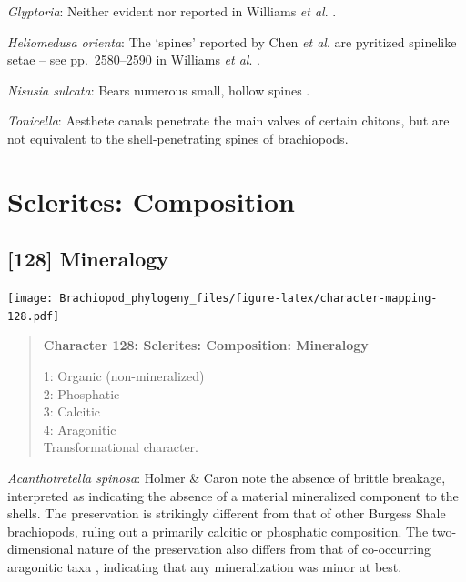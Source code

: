 \documentclass[openany]{book}
\begin{document}
\hypertarget{Glyptoria-coding-127}{}
\emph{Glyptoria}: Neither evident nor reported in Williams \emph{et al}.
\citeyearpar{Williams2000LinguliformeaCraniiformea}.

\hypertarget{Heliomedusa_orienta-coding-127}{}
\emph{Heliomedusa orienta}: The `spines' reported by Chen \emph{et al}.
\citeyearpar{Chen2007Reinterpretationof} are pyritized spinelike setae
-- see pp.~2580--2590 in Williams \emph{et al}.
\citeyearpar{Williams2007Supplement}.

\hypertarget{Nisusia_sulcata-coding-127}{}
\emph{Nisusia sulcata}: Bears numerous small, hollow spines
\citep{Williams2000LinguliformeaCraniiformea}.

\hypertarget{Tonicella-coding-127}{}
\emph{Tonicella}: Aesthete canals penetrate the main valves of certain
chitons, but are not equivalent to the shell-penetrating spines of
brachiopods.

\section{Sclerites: Composition}\label{sclerites-composition}

\subsection*{{[}128{]} Mineralogy}\label{mineralogy}

\texttt{[image: Brachiopod\_phylogeny\_files/figure-latex/character-mapping-128.pdf]}

\begin{quote}
\textbf{Character 128: Sclerites: Composition: Mineralogy}

1: Organic (non-mineralized)\\
2: Phosphatic\\
3: Calcitic\\
4: Aragonitic\\
Transformational character.
\end{quote}

\hypertarget{Acanthotretella_spinosa-coding-128}{}
\emph{Acanthotretella spinosa}: Holmer \& Caron
\citeyearpar{Holmer2006Aspinose} note the absence of brittle breakage,
interpreted as indicating the absence of a material mineralized
component to the shells. The preservation is strikingly different from
that of other Burgess Shale brachiopods, ruling out a primarily calcitic
or phosphatic composition. The two-dimensional nature of the
preservation also differs from that of co-occurring aragonitic taxa
\citep[hyoliths;][ p.~273]{Holmer2006Aspinose}, indicating that any
mineralization was minor at best.
\end{document}
